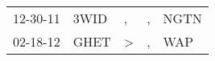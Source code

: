 \begin{supertabular}{p{0.07\textwidth}p{0.06\textwidth}p{0.02\textwidth}p{0.02\textwidth}p{0.06\textwidth}}
 12-30-11\textsuperscript{} &  3WID\textsuperscript{} &             , &  , &  NGTN\textsuperscript{} \\
 02-18-12\textsuperscript{} &  GHET\textsuperscript{} &  \textgreater &  , &   WAP\textsuperscript{} \\
\end{supertabular}
